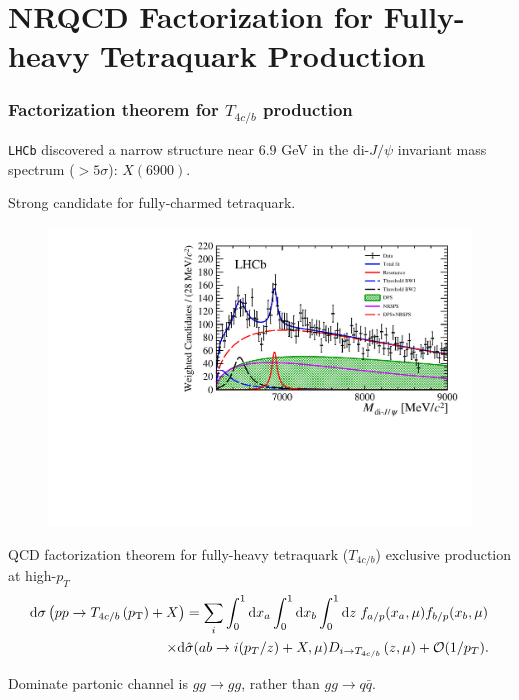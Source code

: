 \section{NRQCD Factorization for Fully-heavy Tetraquark Production}
\begin{frame}
	\frametitle{Factorization theorem for $T_{4c/b}$ production}

	\begin{itemize}
		\begin{minipage}{0.4\textwidth}
			\item {\tt LHCb} discovered a narrow structure near $6.9$ GeV in the di-$J/\psi$ invariant mass spectrum ($>5\sigma$): $X(6900)$.
			\item Strong candidate for fully-charmed tetraquark.
		\end{minipage}\hfill
		\begin{minipage}{0.5\textwidth}
			\begin{figure}
				\centering
				\includegraphics[width=\textwidth,frame]{../Others/Fig3b.pdf}
			\end{figure}
		\end{minipage}
		\item QCD factorization theorem for fully-heavy tetraquark ($T_{4c/b}$) exclusive production at high-$p_T$
		\begin{align}
			\mathrm{d} \sigma\left(p p \rightarrow T_{4c/b}\left(p_{\mathrm{T}}\right)+X\right) &=\sum_{i}\int_0^1 \mathrm{d} x_a  \int_0^1 \mathrm{d} x_b \int_{0}^{1} \mathrm{d} z\; f_{a/p}(x_a,\mu)f_{b/p}(x_b,\mu) \notag\\
			\times  \dd &{\hat \sigma}(a b \rightarrow i(p_T/z)+X, \mu)  D_{i \rightarrow T_{4c/b}}\left(z,\mu\right)+{\cal O}(1/p_T). 
			\label{QCD:fact:theor}
		\end{align}
		\item Dominate partonic channel is $gg\to gg$, rather than $gg\to q\bar{q}$. 
	\end{itemize}

\end{frame}

